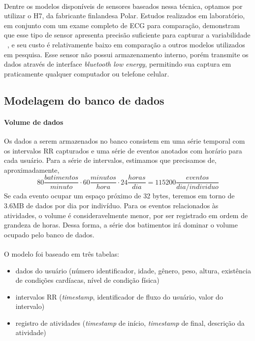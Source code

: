             \paragraph{}
            Dentre os modelos disponíveis de sensores baseados nessa técnica, optamos por utilizar o H7\textsuperscript{\textregistered}, da fabricante finlandesa Polar. Estudos realizados em laboratório, em conjunto com um exame completo de ECG para comparação, demonstram que esse tipo de sensor apresenta precisão suficiente para capturar a variabilidade ~\cite{Plews2017ComparisonMethods, Giles2016ValidityRest.}, e seu custo é relativamente baixo em comparação a outros modelos utilizados em pesquisa. Esse sensor não possui armazenamento interno, porém transmite os dados através de interface \textit{bluetooth low energy}, permitindo sua captura em praticamente qualquer computador ou telefone celular. 

        \subsection{Modelagem do banco de dados}
        \label{modelagembanco}
            
            \paragraph{Volume de dados} Os dados a serem armazenados no banco consistem em uma série temporal com os intervalos RR capturados e uma série de eventos anotados com horário para cada usuário. Para a série de intervalos, estimamos que precisamos de, aproximadamente,
                \begin{equation}
                80 \frac{batimentos}{minuto} \cdot 60 \frac{minutos}{hora} \cdot 24 \frac{horas}{dia} = 115200 \frac{eventos} {dia/individuo}
                \end{equation}
            Se cada evento ocupar um espaço próximo de 32 bytes, teremos em torno de 3.6MB de dados por dia por indivíduo. Para os eventos relacionados às atividades, o volume é consideravelmente menor, por ser registrado em ordem de grandeza de horas. Dessa forma, a série dos batimentos irá dominar o volume ocupado pelo banco de dados.
            
        	\paragraph{}O modelo foi baseado em três tabelas:
            \begin{itemize}
            \item dados do usuário (número identificador, idade, gênero, peso, altura, existência de condições cardíacas, nível de condição física)
            \item intervalos RR (\textit{timestamp}, identificador de fluxo do usuário, valor do intervalo)
            \item registro de atividades (\textit{timestamp} de início, \textit{timestamp} de final, descrição da atividade)
            \end{itemize}
            
